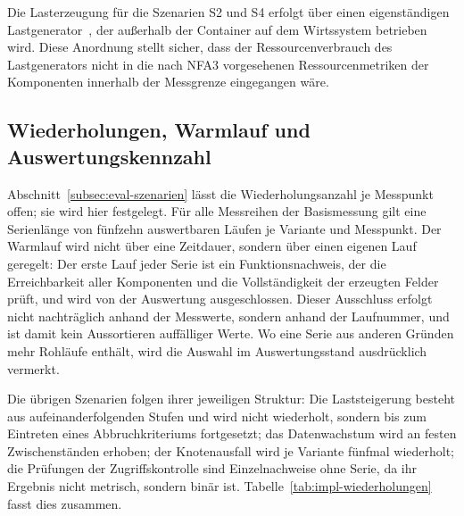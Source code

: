 Die Lasterzeugung für die Szenarien S2 und S4 erfolgt über einen eigenständigen Lastgenerator~\cite{locust}, der außerhalb der Container auf dem Wirtssystem betrieben wird. Diese Anordnung stellt sicher, dass der Ressourcenverbrauch des Lastgenerators nicht in die nach NFA3 vorgesehenen Ressourcenmetriken der Komponenten innerhalb der Messgrenze eingegangen wäre.

\subsection{Wiederholungen, Warmlauf und Auswertungskennzahl}
\label{subsec:impl-kennzahl}

Abschnitt~\ref{subsec:eval-szenarien} lässt die Wiederholungsanzahl je Messpunkt offen; sie wird hier festgelegt. Für alle Messreihen der Basismessung gilt eine Serienlänge von fünfzehn auswertbaren Läufen je Variante und Messpunkt. Der Warmlauf wird nicht über eine Zeitdauer, sondern über einen eigenen Lauf geregelt: Der erste Lauf jeder Serie ist ein Funktionsnachweis, der die Erreichbarkeit aller Komponenten und die Vollständigkeit der erzeugten Felder prüft, und wird von der Auswertung ausgeschlossen. Dieser Ausschluss erfolgt nicht nachträglich anhand der Messwerte, sondern anhand der Laufnummer, und ist damit kein Aussortieren auffälliger Werte. Wo eine Serie aus anderen Gründen mehr Rohläufe enthält, wird die Auswahl im Auswertungsstand ausdrücklich vermerkt.

Die übrigen Szenarien folgen ihrer jeweiligen Struktur: Die Laststeigerung besteht aus aufeinanderfolgenden Stufen und wird nicht wiederholt, sondern bis zum Eintreten eines Abbruchkriteriums fortgesetzt; das Datenwachstum wird an festen Zwischenständen erhoben; der Knotenausfall wird je Variante fünfmal wiederholt; die Prüfungen der Zugriffskontrolle sind Einzelnachweise ohne Serie, da ihr Ergebnis nicht metrisch, sondern binär ist. Tabelle~\ref{tab:impl-wiederholungen} fasst dies zusammen.

